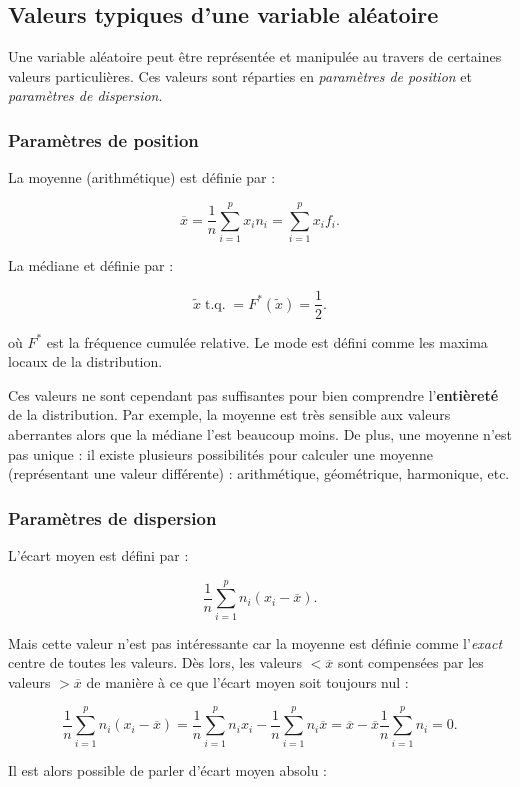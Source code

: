 \documentclass{article}
\DeclareMathOperator{\tq}{\text{ t.q. }}
\begin{document}
	\subsection{Valeurs typiques d'une variable aléatoire}
		Une variable aléatoire peut être représentée et manipulée au travers de certaines valeurs particulières. Ces valeurs sont réparties en \textit{paramètres de position}
		et \textit{paramètres de dispersion}.

		\subsubsection{Paramètres de position}
			La moyenne (arithmétique) est définie par :

			\[\overline{x} = \frac 1n\sum_{i=1}^px_in_i = \sum_{i=1}^px_if_i.\]

			La médiane et définie par :

			\[\widetilde{x} \tq = F^*(\widetilde{x}) = \frac 12.\]

			où $F^*$ est la fréquence cumulée relative. Le mode est défini comme les maxima locaux de la distribution.

			Ces valeurs ne sont cependant pas suffisantes pour bien comprendre l'\textbf{entièreté} de la distribution. Par exemple, la moyenne est très sensible aux valeurs
			aberrantes alors que la médiane l'est beaucoup moins. De plus, une moyenne n'est pas unique : il existe plusieurs possibilités pour calculer une moyenne
			(représentant une valeur différente) : arithmétique, géométrique, harmonique, etc.

		\subsubsection{Paramètres de dispersion}
			L'écart moyen est défini par :

			\[\frac 1n\sum_{i=1}^pn_i(x_i-\overline{x}).\]

			Mais cette valeur n'est pas intéressante car la moyenne est définie comme l'\textit{exact} centre de toutes les valeurs. Dès lors, les valeurs $< \overline x$
			sont compensées par les valeurs $> \overline x$ de manière à ce que l'écart moyen soit toujours nul :

			\[\frac 1n\sum_{i=1}^pn_i(x_i-\overline x) = \frac 1n\sum_{i=1}^pn_ix_i - \frac 1n\sum_{i=1}^pn_i\overline x =\overline x - \overline{x}\frac 1n\sum_{i=1}^pn_i = 0.\]

			Il est alors possible de parler d'écart moyen absolu :
\end{document}
